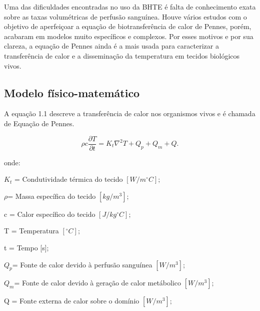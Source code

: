    Uma das dificuldades encontradas no uso da BHTE é falta de conhecimento exata sobre as taxas volumétricas de perfusão sanguínea\cite{Olho}.
      Houve vários estudos com o objetivo de aperfeiçoar a equação de biotransferência de calor de Pennes, porém, acabaram em modelos muito específicos e complexos. Por esses motivos e por sua clareza, a equação de Pennes ainda é a mais usada para caracterizar a transferência de calor e a disseminação da temperatura em tecidos biológicos vivos.




 \subsection{Modelo físico-matemático}

    A equação 1.1  descreve a transferência de calor nos organismos vivos e é chamada de Equação de Pennes. 
   

  \begin{equation}\rho c\frac{\partial T}{\partial t} = K_{t}\nabla^{2}T+ Q_{p} + Q_{m} + Q . \end{equation}


  onde:


 $ K_{t} $ = Condutividade térmica do tecido $[W/m^{\circ}C];$ 

  $\rho $= Massa específica do tecido $[kg/m^3];$

 c = Calor específico do tecido $[J/kg^{\circ}C];$

  T = Temperatura $[^{\circ}C];$

  t = Tempo [s];

   $ Q_{p} $= Fonte de calor devido à perfusão sanguínea $[W/m^3];$


   $Q_{m} $= Fonte de calor devido à geração de calor metábolico $[W/m^3];$

  Q = Fonte externa de calor sobre o domínio $[W/m^3];$

